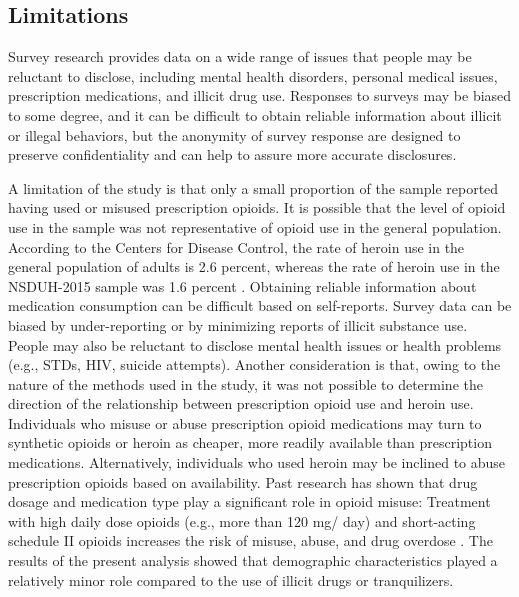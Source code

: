 \documentclass[sigconf]{acmart}
\begin{document}
\subsection{Limitations}
Survey research 
provides data on a wide range of issues that people may be reluctant to 
disclose, including mental health disorders, personal medical issues, 
prescription medications, and illicit drug use. Responses to surveys may be 
biased to some degree, and it can be difficult to obtain reliable information 
about illicit or illegal behaviors, but the anonymity of survey response are 
designed to preserve confidentiality and can help to assure more accurate 
disclosures. 


A limitation of the study is that only a small proportion of the sample 
reported having used or misused prescription opioids. It is possible that the 
level of opioid use in the sample was not representative of opioid use in the 
general population. According to the Centers for Disease Control, the rate
of heroin use in the general population of adults is 2.6 percent, whereas
the rate of heroin use in the NSDUH-2015 sample was 1.6 percent \cite{cdc16}. 
Obtaining reliable information about medication consumption can be difficult 
based on self-reports. Survey data can be biased by under-reporting or by 
minimizing reports of illicit substance use. People may also be reluctant to 
disclose mental health issues or health problems (e.g., STDs, HIV, suicide 
attempts). Another consideration is that, owing to the nature of the methods 
used in the study, it was not possible to determine the direction of the 
relationship between prescription opioid use and heroin use. Individuals who 
misuse or abuse prescription opioid medications may turn to synthetic opioids 
or heroin as cheaper, more readily available than prescription medications. 
Alternatively, individuals who used heroin may be inclined to abuse 
prescription opioids based on availability. Past research has shown that drug 
dosage and medication type play a significant role in opioid misuse: Treatment 
with high daily dose opioids (e.g., more than 120 mg/ day) and short-acting 
schedule II opioids increases the risk of misuse, abuse, and drug overdose 
\cite{sullivan10}. The results of the present analysis showed that demographic 
characteristics played a relatively minor role compared to the use of illicit 
drugs or tranquilizers. 

\end{document}
